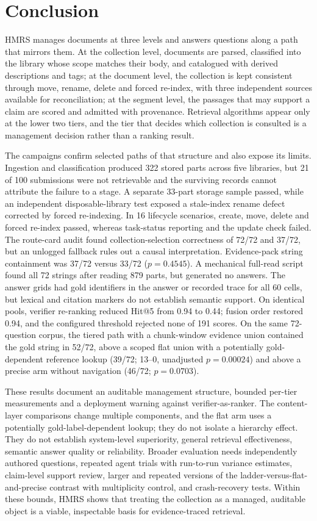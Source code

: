\section{Conclusion}
\label{sec:conclusion}

HMRS manages documents at three levels and answers questions along a path that
mirrors them. At the collection level, documents are parsed, classified into
the library whose scope matches their body, and catalogued with derived
descriptions and tags; at the document level, the collection is kept
consistent through move, rename, delete and forced re-index, with three
independent sources available for reconciliation; at the segment level, the
passages that may support a claim are scored and admitted with provenance.
Retrieval algorithms appear only at the lower two tiers, and the tier that
decides which collection is consulted is a management decision rather than a
ranking result.

The campaigns confirm selected paths of that structure and also expose its
limits. Ingestion and classification produced 322 stored parts across five
libraries, but 21 of 100 submissions were not retrievable and the surviving
records cannot attribute the failure to a stage. A separate 33-part storage
sample passed, while an independent disposable-library test exposed a
stale-index rename defect corrected by forced re-indexing. In 16 lifecycle
scenarios, create, move, delete and forced re-index passed, whereas task-status
reporting and the update check failed. The route-card audit found
collection-selection correctness of 72/72 and 37/72, but an unlogged fallback
rules out a causal interpretation. Evidence-pack string containment was
37/72 versus 33/72 ($p=0.4545$). A mechanical full-read script found all 72
strings after reading 879 parts, but generated no answers. The answer grids had
gold identifiers in the answer or recorded trace for all 60 cells, but lexical and citation markers do not
establish semantic support. On identical pools, verifier re-ranking reduced
Hit@5 from 0.94 to 0.44; fusion order restored 0.94, and the configured
threshold rejected none of 191 scores. On the same 72-question corpus, the
tiered path with a chunk-window evidence union contained the gold string in
52/72, above a scoped flat union with a potentially gold-dependent reference
lookup (39/72; 13--0, unadjusted $p=0.00024$) and above a precise arm without navigation (46/72;
$p=0.0703$).

These results document an auditable management structure, bounded per-tier
measurements and a deployment warning against verifier-as-ranker. The
content-layer comparisons change multiple components, and the flat arm uses a
potentially gold-label-dependent lookup; they do not isolate a hierarchy effect. They
do not establish system-level superiority, general retrieval effectiveness,
semantic answer quality or reliability. Broader evaluation needs independently
authored questions, repeated agent trials with run-to-run variance estimates,
claim-level support review, larger and repeated versions of the
ladder-versus-flat-and-precise contrast with multiplicity control, and
crash-recovery tests. Within these bounds, HMRS shows that treating the
collection as a managed, auditable object is a viable, inspectable basis for
evidence-traced retrieval.
